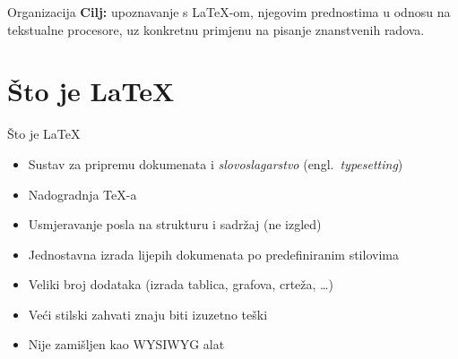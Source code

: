 \documentclass{beamer}
\begin{document}
\begin{frame}[t]{Organizacija}
\textbf{Cilj:} upoznavanje s \LaTeX-om, njegovim prednostima u odnosu na
tekstualne procesore, uz konkretnu primjenu na pisanje znanstvenih radova.

\begin{multicols}{2}
\tableofcontents
\end{multicols}
\end{frame}

\section{Što je \LaTeX{}}
\begin{frame}[t]{Što je \LaTeX{}}
\begin{itemize}
  \item Sustav za pripremu dokumenata i \emph{slovoslagarstvo} (engl.\ \emph{typesetting})
  \item Nadogradnja \TeX-a
  \item Usmjeravanje posla na strukturu i sadržaj (ne izgled)
  \item Jednostavna izrada lijepih dokumenata po predefiniranim stilovima
  \item Veliki broj dodataka (izrada tablica, grafova, crteža, \ldots)
  \item Veći stilski zahvati znaju biti izuzetno teški
  \item Nije zamišljen kao WYSIWYG alat
\end{itemize}
\end{frame}
\end{document}
